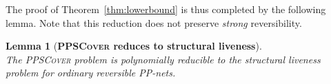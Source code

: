 \documentclass[11pt,a4paper]{amsart}
\newcommand{\PPSCover}{\textsc{PPSCover}\xspace}
\let\origtextsc\textsc
\renewcommand{\textsc}[1]{\textnormal{\origtextsc{#1}}}
\theoremstyle{plain}
\newtheorem{lem}[thm]{Lemma}
\theoremstyle{definition}
\theoremstyle{defC}
\theoremstyle{thmC}
\begin{document}
\noindent
The proof of Theorem~\ref{thm:lowerbound} is thus completed by the following lemma.
Note that this reduction does not preserve \emph{strong}
reversibility.

\begin{lem}[\textbf{\PPSCover reduces to structural liveness}]\label{lem:PPSCtoSLP}
\hfill\\
	The \PPSCover problem is polynomially reducible to the structural
	liveness problem for ordinary reversible PP-nets.
\end{lem}
\begin{figure}[t]
\begin{center}
\end{center}
\end{figure}
\end{document}
